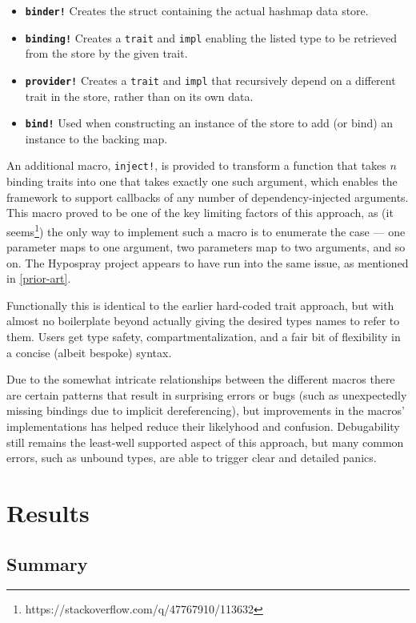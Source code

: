 \documentclass[sigconf]{acmart}
\def\code#1{\lstinline{#1}}
\begin{document}
\begin{itemize}
\item \textbf{\code{binder!}} Creates the struct containing the actual hashmap data store.
\item \textbf{\code{binding!}} Creates a \code{trait} and \code{impl} enabling the listed type to be retrieved from the store by the given trait.
\item \textbf{\code{provider!}} Creates a \code{trait} and \code{impl} that recursively depend on a different trait in the store, rather than on its own data.
\item \textbf{\code{bind!}} Used when constructing an instance of the store to add (or bind) an instance to the backing map.
\end{itemize}

An additional macro, \code{inject!}, is provided to transform a function that takes $n$ binding traits into one that takes exactly one such argument, which enables the framework to support callbacks of any number of dependency-injected arguments. This macro proved to be one of the key limiting factors of this approach, as (it seems\footnote{https://stackoverflow.com/q/47767910/113632}) the only way to implement such a macro is to enumerate the case --- one parameter maps to one argument, two parameters map to two arguments, and so on. The Hypospray project appears to have run into the same issue, as mentioned in \ref{prior-art}.

Functionally this is identical to the earlier hard-coded trait approach, but with almost no boilerplate beyond actually giving the desired types names to refer to them. Users get type safety, compartmentalization, and a fair bit of flexibility in a concise (albeit bespoke) syntax.

Due to the somewhat intricate relationships between the different macros there are certain patterns that result in surprising errors or bugs (such as unexpectedly missing bindings due to implicit dereferencing), but improvements in the macros' implementations has helped reduce their likelyhood and confusion. Debugability still remains the least-well supported aspect of this approach, but many common errors, such as unbound types, are able to trigger clear and detailed panics.

\section{Results}

\subsection{Summary}
\end{document}
